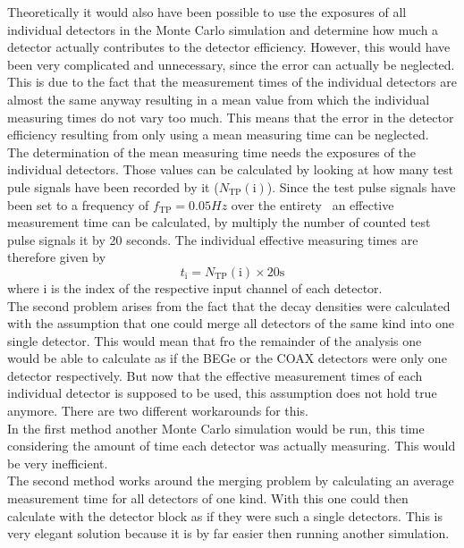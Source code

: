 \documentclass[encoding=utf8,british]{tumphthesis}
\begin{document}
Theoretically it would also have been possible to use the exposures of all individual detectors in the Monte Carlo simulation and determine how much a detector actually contributes to the detector efficiency.
However, this would have been very complicated and unnecessary, since the error can actually be neglected.
This is due to the fact that the measurement times of the individual detectors are almost the same anyway resulting in a mean value from which the individual measuring times do not vary too much.
This means that the error in the detector efficiency resulting from only using a mean measuring time can be neglected.  
\\
\fi
\iffalse
The determination of the mean measuring time needs the exposures of the individual detectors.
Those values can be calculated by looking at how many test pule signals have been recorded by it ($N_{\mathrm{TP}}(\mathrm{i})$). 
Since the test pulse signals have been set to a frequency of $f_\mathrm{TP} = 0.05\unit{Hz} $ over the entirety \PII\, an effective measurement time can be calculated, by multiply the number of counted test pulse signals it by 20 seconds.
The individual effective measuring times are therefore given by
\begin{equation*}
    t_\mathrm{i} = N_{\mathrm{TP}}(\mathrm{i}) \times 20\mathrm{s}
\end{equation*}
where i is the index of the respective input channel of each detector.
\\

The second problem arises from the fact that the decay densities were  calculated with the assumption that one could merge all detectors of the same kind into one single detector.
This would mean that fro the remainder of the analysis one would be able to calculate as if the BEGe or the COAX detectors were only one detector respectively.
But now that the effective measurement times of each individual detector is supposed to be used, this assumption does not hold true anymore.
There are two different workarounds for this.
\\

In the first method another Monte Carlo simulation would be run, this time considering the amount of time each detector was actually measuring.
This would be very inefficient.
\\

The second method works around the merging problem by calculating an average measurement time for all detectors of one kind.
With this one could then calculate with the detector block as if they were such a single detectors.
This is very elegant solution because it is by far easier then running another simulation.
\\
\end{document}
